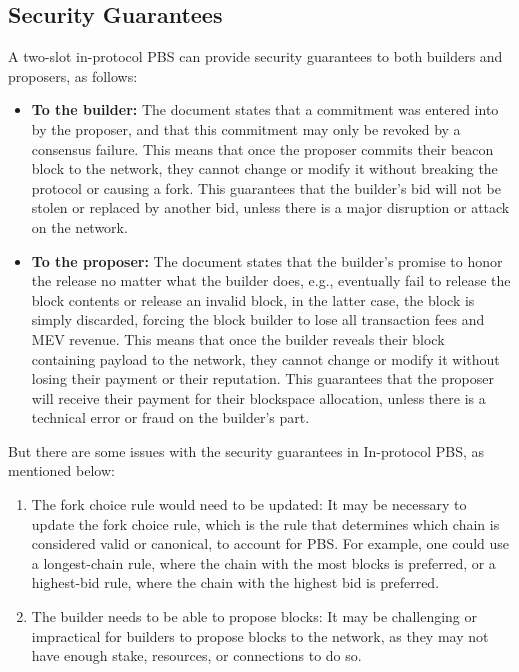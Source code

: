 \subsection{Security Guarantees}
A two-slot in-protocol PBS can provide security guarantees to both builders and proposers, as follows:
\begin{itemize}
	\item \textbf{To the builder:} The document states that a commitment was entered into by the proposer, and that this commitment may only be revoked by a consensus failure. This means that once the proposer commits their beacon block to the network, they cannot change or modify it without breaking the protocol or causing a fork. This guarantees that the builder’s bid will not be stolen or replaced by another bid, unless there is a major disruption or attack on the network.
	\item \textbf{To the proposer:} The document states that the builder’s promise to honor the release no matter what the builder does, e.g., eventually fail to release the block contents or release an invalid block, in the latter case, the block is simply discarded, forcing the block builder to lose all transaction fees and MEV revenue. This means that once the builder reveals their block containing payload to the network, they cannot change or modify it without losing their payment or their reputation. This guarantees that the proposer will receive their payment for their blockspace allocation, unless there is a technical error or fraud on the builder’s part.
\end{itemize}
But there are some issues with the security guarantees in In-protocol PBS, as mentioned below:
\begin{enumerate}
	\item The fork choice rule would need to be updated: It may be necessary to update the fork choice rule, which is the rule that determines which chain is considered valid or canonical, to account for PBS. For example, one could use a longest-chain rule, where the chain with the most blocks is preferred, or a highest-bid rule, where the chain with the highest bid is preferred.
	\item The builder needs to be able to propose blocks: It may be challenging or impractical for builders to propose blocks to the network, as they may not have enough stake, resources, or connections to do so.
\end{enumerate}

